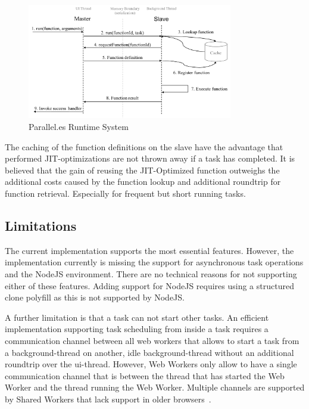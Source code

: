\begin{figure}
	\centering
	\includegraphics[width=0.8\textwidth]{runtime-system.pdf}

	\caption{Parallel.es Runtime System}
	\label{fig:runtime-system}
\end{figure}

The caching of the function definitions on the slave have the advantage that performed JIT-optimizations are not thrown away if a task has completed. It is believed that the gain of reusing the JIT-Optimized function outweighs the additional costs caused by the function lookup and additional roundtrip for function retrieval. Especially for frequent but short running tasks. 


\subsection{Limitations}
The current implementation supports the most essential features. However, the implementation currently is missing the support for asynchronous task operations and the NodeJS environment. There are no technical reasons for not supporting either of these features. Adding support for NodeJS requires using a structured clone polyfill as this is not supported by NodeJS.

A further limitation is that a task can not start other tasks. An efficient implementation supporting task scheduling from inside a task requires a communication channel between all web workers that allows to start a task from a background-thread on another, idle background-thread without an additional roundtrip over the ui-thread. However, Web Workers only allow to have a single communication channel that is between the thread that has started the Web Worker and the thread running the Web Worker. Multiple channels are supported by Shared Workers that lack support in older browsers~\cite[section 4.6.4]{w3cWebWorker}.